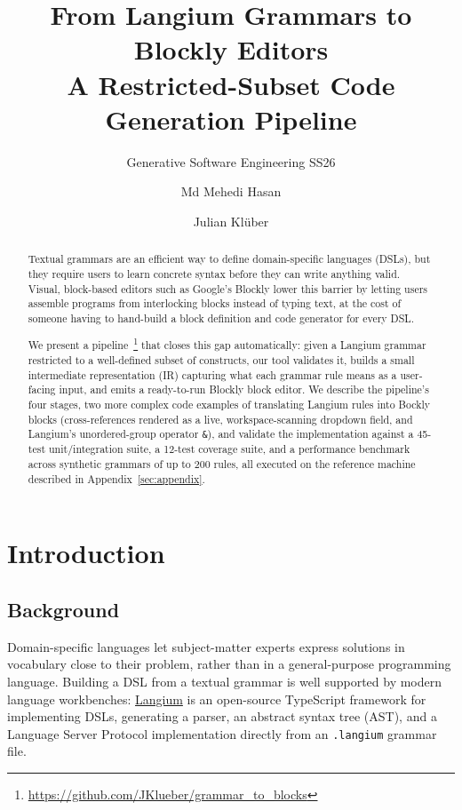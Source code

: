 \documentclass[runningheads]{llncs}
\begin{document}
%
\title{From Langium Grammars to Blockly Editors\\ A Restricted-Subset Code Generation Pipeline}
\subtitle{\scriptsize Generative Software Engineering SS26}
%
%
\author{Md Mehedi Hasan \and Julian Klüber}
%
\maketitle              %
%
\begin{abstract}
Textual grammars are an efficient way to define domain-specific languages (DSLs), but they require users to learn concrete syntax before they can write anything valid. Visual, block-based editors such as Google's Blockly lower this barrier by letting users assemble programs from interlocking blocks instead of typing text, at the cost of someone having to hand-build a block definition and code generator for every DSL.

We present a pipeline~\footnote{\url{https://github.com/JKlueber/grammar_to_blocks}} that closes this gap automatically: given a Langium grammar restricted to a well-defined subset of constructs, our tool validates it, builds a small intermediate representation (IR) capturing what each grammar rule means as a user-facing input, and emits a ready-to-run Blockly block editor. We describe the pipeline's four stages, two more complex code examples of translating Langium rules into Bockly blocks (cross-references rendered as a live, workspace-scanning dropdown field, and Langium's unordered-group operator \texttt{\&}), and validate the implementation against a 45-test unit/integration suite, a 12-test coverage suite, and a performance benchmark across synthetic grammars of up to 200 rules, all executed on the reference machine described in Appendix~\ref{sec:appendix}.
\end{abstract}

\section{Introduction}

\subsection{Background}
Domain-specific languages let subject-matter experts express solutions in vocabulary close to their problem, rather than in a general-purpose programming language. Building a DSL from a textual grammar is well supported by modern language workbenches: \href{https://langium.org/}{Langium} is an open-source TypeScript framework for implementing DSLs, generating a parser, an abstract syntax tree (AST), and a Language Server Protocol implementation directly from an \texttt{.langium} grammar file.
\end{document}
